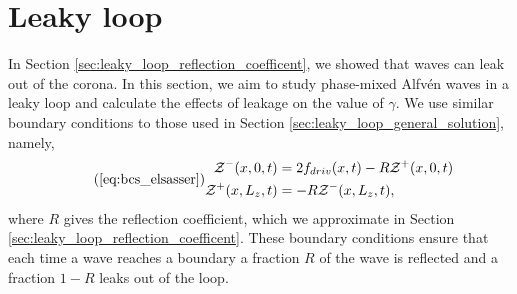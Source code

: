 \section{Leaky loop}
\label{sec:chap_3_leaky_loop}

In Section \ref{sec:leaky_loop_reflection_coefficent}, we showed that waves can leak out of the corona. In this section, we aim to study phase-mixed Alfv\'en waves in a leaky loop and calculate the effects of leakage on the value of $\gamma$. We use similar boundary conditions to those used in Section \ref{sec:leaky_loop_general_solution}, namely, 
\begin{equation}
    \tag{\ref{eq:bcs_elsasser}}
    \begin{aligned}
    \mathcal{Z}^{-}(x,0,t) &= 2f_{driv}(x,t) - R\mathcal{Z}^+(x,0,t) \\
    \mathcal{Z}^{+}(x,L_z,t) &= -R\mathcal{Z}^-(x,L_z,t),
    \end{aligned}
\end{equation}
where $R$ gives the reflection coefficient, which we approximate in Section \ref{sec:leaky_loop_reflection_coefficent}. These boundary conditions ensure that each time a wave reaches a boundary a fraction $R$ of the wave is reflected and a fraction $1-R$ leaks out of the loop.

